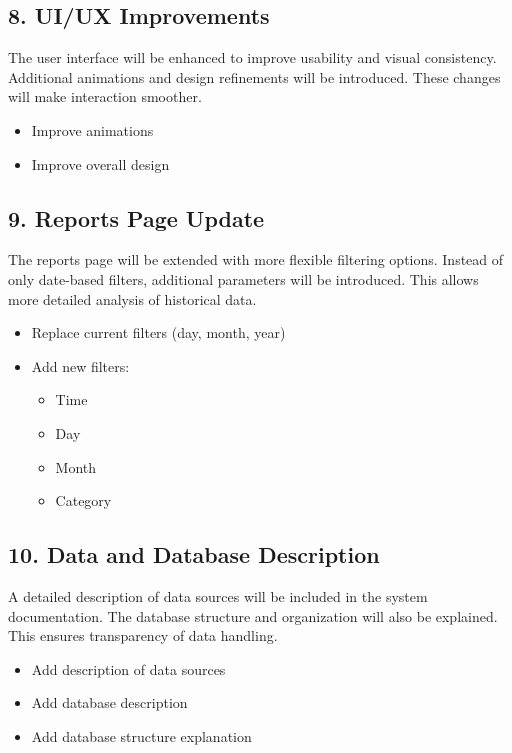 \documentclass[12pt,a4paper]{report}
\begin{document}
\subsection*{8. UI/UX Improvements}
The user interface will be enhanced to improve usability and visual consistency. Additional animations and design refinements will be introduced. These changes will make interaction smoother.

\begin{itemize}
    \item Improve animations
    \item Improve overall design
\end{itemize}

\subsection*{9. Reports Page Update}
The reports page will be extended with more flexible filtering options. Instead of only date-based filters, additional parameters will be introduced. This allows more detailed analysis of historical data.

\begin{itemize}
    \item Replace current filters (day, month, year)
    \item Add new filters:
    \begin{itemize}
        \item Time
        \item Day
        \item Month
        \item Category
    \end{itemize}
\end{itemize}

\subsection*{10. Data and Database Description}
A detailed description of data sources will be included in the system documentation. The database structure and organization will also be explained. This ensures transparency of data handling.

\begin{itemize}
    \item Add description of data sources
    \item Add database description
    \item Add database structure explanation
\end{itemize}
\end{document}
